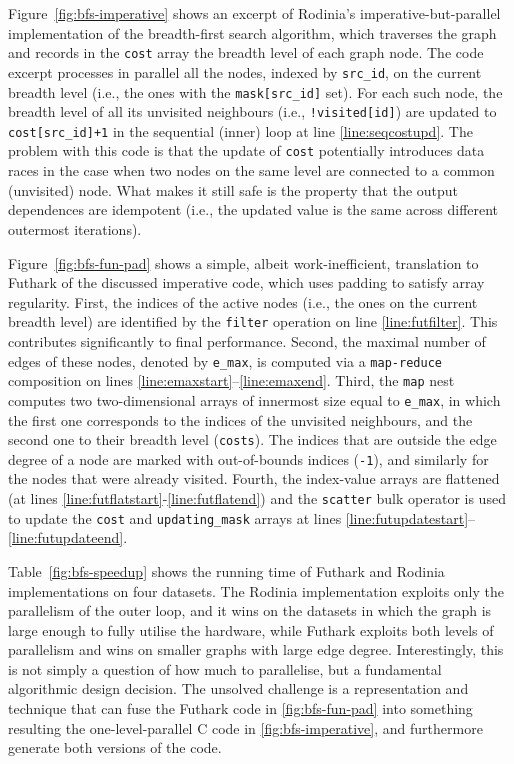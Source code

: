Figure~\ref{fig:bfs-imperative} shows an excerpt of Rodinia's
imperative-but-parallel implementation of the breadth-first search
algorithm, which traverses the graph and records in the
\lstinline{cost} array the breadth level of each graph node.
%
The code excerpt processes in parallel all the nodes, indexed by \lstinline{src_id},
on the current breadth level (i.e., the ones with the \lstinline{mask[src_id]} set).
%
For each such node, the breadth level of all its unvisited neighbours
(i.e., \lstinline{!visited[id]}) are updated to \lstinline{cost[src_id]+1} in the
sequential (inner) loop at line \ref{line:seqcostupd}.
%
The problem with this code is that the update of \lstinline{cost}
potentially introduces data races in the case when two nodes on the
same level are connected to a common (unvisited) node.  What makes it
still safe is the property that the output dependences are idempotent
(i.e., the updated value is the same across different outermost
iterations).

Figure~\ref{fig:bfs-fun-pad} shows a simple, albeit work-inefficient,
translation to Futhark of the discussed imperative code, which uses
padding to satisfy array regularity. First, the indices of the active
nodes (i.e., the ones on the current breadth level) are identified by
the \lstinline{filter} operation on line \ref{line:futfilter}.  This
contributes significantly to final performance.  Second, the maximal
number of edges of these nodes, denoted by \lstinline{e_max}, is
computed via a \lstinline{map-reduce} composition on lines
\ref{line:emaxstart}--\ref{line:emaxend}.  Third, the \lstinline{map}
nest computes two two-dimensional arrays of innermost size equal to
\lstinline{e_max}, in which the first one corresponds to the indices
of the unvisited neighbours, and the second one to their breadth level
(\lstinline{costs}).  The indices that are outside the edge degree of
a node are marked with out-of-bounds indices (\lstinline{-1}), and
similarly for the nodes that were already visited.
%
Fourth, the index-value arrays are flattened (at lines
\ref{line:futflatstart}-\ref{line:futflatend}) and the
\lstinline{scatter} bulk operator is used to update the
\lstinline{cost} and \lstinline{updating_mask} arrays at lines
\ref{line:futupdatestart}--\ref{line:futupdateend}.

Table~\ref{fig:bfs-speedup} shows the running time of Futhark and
Rodinia implementations on four datasets. The Rodinia implementation
exploits only the parallelism of the outer loop, and it wins on the
datasets in which the graph is large enough to fully utilise the
hardware, while Futhark exploits both levels of parallelism and wins
on smaller graphs with large edge degree.  Interestingly, this is not
simply a question of how much to parallelise, but a fundamental
algorithmic design decision.  The unsolved challenge is a
representation and technique that can fuse the Futhark code in
\cref{fig:bfs-fun-pad} into something resulting the one-level-parallel
C code in \cref{fig:bfs-imperative}, and furthermore generate both
versions of the code.

